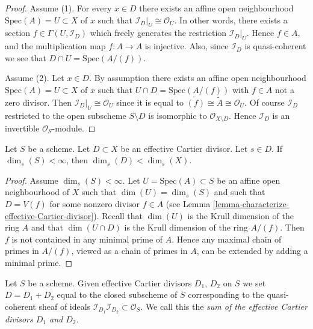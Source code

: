 \begin{proof}
Assume (1).  For every $x \in D$ there exists an affine open neighbourhood
$\text{Spec}(A) = U \subset X$ of $x$ such that
$\mathcal{I}_D|_U \cong \mathcal{O}_U$. In other words, there exists
a section $f \in \Gamma(U, \mathcal{I}_D)$ which freely generates the
restriction $\mathcal{I}_D|_U$. Hence $f \in A$, and the multiplication
map $f : A \to A$ is injective. Also, since $\mathcal{I}_D$ is
quasi-coherent we see that $D \cap U = \text{Spec}(A/(f))$.

\medskip\noindent
Assume (2). Let $x \in D$. By assumption there exists an affine open
neighbourhood $\text{Spec}(A) = U \subset X$ of $x$ such that
$U \cap D = \text{Spec}(A/(f))$ with $f \in A$ not a zero divisor.
Then $\mathcal{I}_D|_U \cong \mathcal{O}_U$ since it is equal to
$\widetilde{(f)} \cong \widetilde{A} \cong \mathcal{O}_U$.
Of course $\mathcal{I}_D$ restricted to the open subscheme
$S \setminus D$ is isomorphic to $\mathcal{O}_{X \setminus D}$.
Hence $\mathcal{I}_D$ is an invertible $\mathcal{O}_S$-module.
\end{proof}

\begin{lemma}
\label{lemma-effective-Cartier-makes-dimension-drop}
Let $S$ be a scheme.
Let $D \subset X$ be an effective Cartier divisor.
Let $s \in D$.
If $\dim_s(S) < \infty$, then $\dim_s(D) < \dim_s(X)$.
\end{lemma}

\begin{proof}
Assume $\dim_s(S) < \infty$.
Let $U = \text{Spec}(A) \subset S$ be an affine open neighbourhood
of $X$ such that $\dim(U) = \dim_s(S)$ and such that $D = V(f)$
for some nonzero divisor $f \in A$ (see
Lemma \ref{lemma-characterize-effective-Cartier-divisor}).
Recall that $\dim(U)$ is the Krull dimension of the ring $A$
and that $\dim(U \cap D)$ is the Krull dimension of the ring $A/(f)$.
Then $f$ is not contained in any minimal prime of $A$.
Hence any maximal chain of primes in $A/(f)$, viewed as a chain
of primes in $A$, can be extended by adding a minimal prime.
\end{proof}

\begin{definition}
\label{definition-sum-effective-Cartier-divisors}
Let $S$ be a scheme. Given effective Cartier divisors
$D_1$, $D_2$ on $S$ we set $D = D_1 + D_2$ equal to the
closed subscheme of $S$ corresponding to the quasi-coherent
sheaf of ideals
$\mathcal{I}_{D_1}\mathcal{I}_{D_2} \subset \mathcal{O}_S$.
We call this the {\it sum of the effective Cartier divisors
$D_1$ and $D_2$}.
\end{definition}

